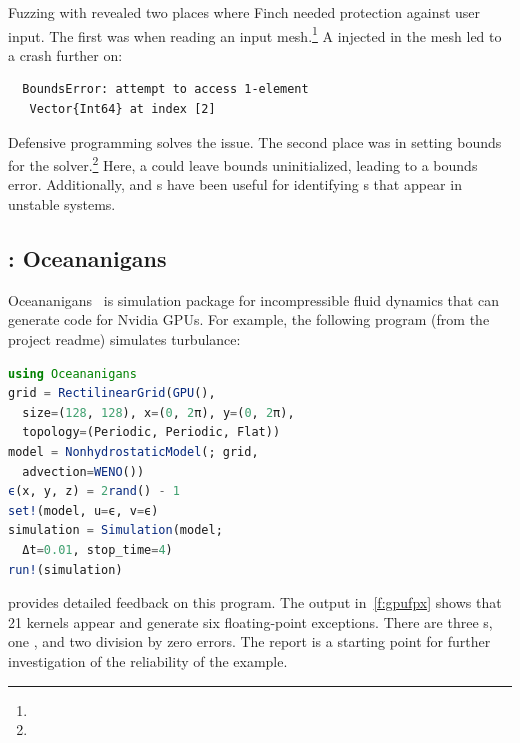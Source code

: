 \documentclass{juliacon}
\begin{document}
Fuzzing with \FT{} revealed two places where Finch needed
protection against user input.
The first was when reading an input mesh.\footnote{}
A \NaN{} injected in the mesh led to a crash further on:
\begin{verbatim}
  BoundsError: attempt to access 1-element
   Vector{Int64} at index [2]
\end{verbatim}
Defensive programming solves the issue.
The second place was in setting bounds for the
solver.\footnote{}
Here, a \NaN{} could leave bounds uninitialized, leading to a bounds error.
Additionally, \FT{} and \CSTG{}s have been useful for identifying \NaN{}s that
appear in unstable systems.

\subsection{\GPUFPX{}: Oceananigans}
\label{s:ocean}

Oceananigans~\cite{OceananigansJOSS} is simulation package for incompressible
fluid dynamics that can generate code for Nvidia GPUs.
For example, the following program (from the project readme) simulates turbulance:

\begin{lstlisting}[language = Julia]
using Oceananigans
grid = RectilinearGrid(GPU(),
  size=(128, 128), x=(0, 2π), y=(0, 2π),
  topology=(Periodic, Periodic, Flat))
model = NonhydrostaticModel(; grid,
  advection=WENO())
ϵ(x, y, z) = 2rand() - 1
set!(model, u=ϵ, v=ϵ)
simulation = Simulation(model;
  Δt=0.01, stop_time=4)
run!(simulation)
\end{lstlisting}

\GPUFPX{} provides detailed feedback on this program.
The output in~\cref{f:gpufpx} shows that 21 kernels
appear and generate six floating-point exceptions.
There are three \NaN{}s, one \Inf{}, and two division
by zero errors.
The report is a starting point for further investigation
of the reliability of the example.
\end{document}

